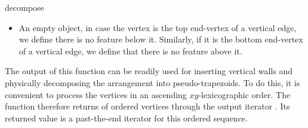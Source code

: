 \begin{ccRefFunction}{decompose}
{\begin{itemize}
         above (or below) another arrangement vertex.
   \item An empty object, in case the vertex is the top end-vertex of
         a vertical edge, we define there is no feature below it. Similarly, if
         it is the bottom end-vertex of a vertical edge, we define that there
         is no feature above it.
   \end{itemize}
   The output of this function can be readily used for inserting vertical walls
   and physically decomposing the arrangement into pseudo-trapezoids. To do
   this, it is convenient to process the vertices in an ascending
   $xy$-lexicographic order. The function therefore returns of ordered vertices
   through the output iterator . Its returned value is a past-the-end
   iterator for this ordered sequence.
    }

\end{ccRefFunction}

\ccRefPageEnd
